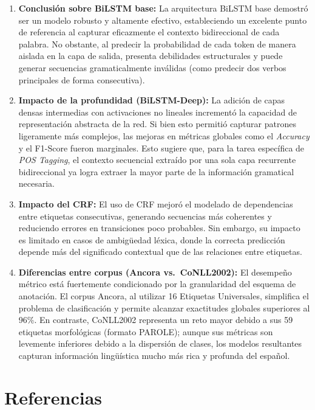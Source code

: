 \documentclass[12pt, a4paper]{article}
\begin{document}
\begin{enumerate}
    \item \textbf{Conclusión sobre BiLSTM base:} La arquitectura BiLSTM base demostró ser un modelo robusto y altamente efectivo, estableciendo un excelente punto de referencia al capturar eficazmente el contexto bidireccional de cada palabra. No obstante, al predecir la probabilidad de cada token de manera aislada en la capa de salida, presenta debilidades estructurales y puede generar secuencias gramaticalmente inválidas (como predecir dos verbos principales de forma consecutiva).

    \item \textbf{Impacto de la profundidad (BiLSTM-Deep):} La adición de capas densas intermedias con activaciones no lineales incrementó la capacidad de representación abstracta de la red. Si bien esto permitió capturar patrones ligeramente más complejos, las mejoras en métricas globales como el \textit{Accuracy} y el F1-Score fueron marginales. Esto sugiere que, para la tarea específica de \textit{POS Tagging}, el contexto secuencial extraído por una sola capa recurrente bidireccional ya logra extraer la mayor parte de la información gramatical necesaria.

    \item \textbf{Impacto del CRF:} El uso de CRF mejoró el modelado de dependencias entre etiquetas consecutivas, generando secuencias más coherentes y reduciendo errores en transiciones poco probables. Sin embargo, su impacto es limitado en casos de ambigüedad léxica, donde la correcta predicción depende más del significado contextual que de las relaciones entre etiquetas.

    \item \textbf{Diferencias entre corpus (Ancora vs.\ CoNLL2002):} El desempeño métrico está fuertemente condicionado por la granularidad del esquema de anotación. El corpus Ancora, al utilizar 16 Etiquetas Universales, simplifica el problema de clasificación y permite alcanzar exactitudes globales superiores al 96\%. En contraste, CoNLL2002 representa un reto mayor debido a sus 59 etiquetas morfológicas (formato PAROLE); aunque sus métricas son levemente inferiores debido a la dispersión de clases, los modelos resultantes capturan información lingüística mucho más rica y profunda del español.
\end{enumerate}

\section*{Referencias}
\end{document}
